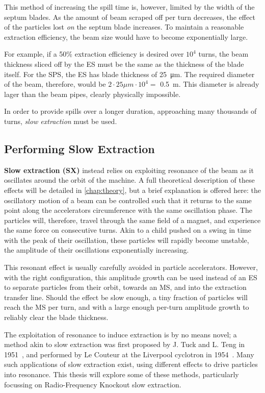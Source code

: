 \documentclass[11pt]{report}
\begin{document}
This method of increasing the spill time is, however, limited by the width of the septum blades. As the amount of beam scraped off per turn decreases, the effect of the particles lost \textit{on} the septum blade increases. To maintain a reasonable extraction efficiency, the beam size would have to become exponentially large.

For example, if a 50\% extraction efficiency is desired over $10^4$ turns, the beam thickness sliced off by the ES must be the same as the thickness of the blade itself. For the SPS, the ES has blade thickness of \qty{25}{\micro\meter}. The required diameter of the beam, therefore, would be $2\cdot 25\mu m\cdot 10^4 = $ \qty{0.5}{\meter}. This diameter is already lager than the beam pipes, clearly physically impossible.

In order to provide spills over a longer duration, approaching many thousands of turns, \textit{slow extraction} must be used. 

\subsection{Performing Slow Extraction}

\textbf{Slow extraction (SX)} instead relies on exploiting resonance of the beam as it oscillates around the orbit of the machine. A full theoretical description of these effects will be detailed in \autoref{chap:theory}, but a brief explanation is offered here: the oscillatory motion of a beam can be controlled such that it returns to the same point along the accelerators circumference with the same oscillation phase. The particles will, therefore, travel through the same field of a magnet, and experience the same force on consecutive turns. Akin to a child pushed on a swing in time with the peak of their oscillation, these particles will rapidly become unstable, the amplitude of their oscillations exponentially increasing. 

This resonant effect is usually carefully avoided in particle accelerators. However, with the right configuration, this amplitude growth can be used instead of an ES to separate particles from their orbit, towards an MS, and into the extraction transfer line. Should the effect be slow enough, a tiny fraction of particles will reach the MS per turn, and with a large enough per-turn amplitude growth to reliably clear the blade thickness.

The exploitation of resonance to induce extraction is by no means novel; a method akin to slow extraction was first proposed by J. Tuck and L. Teng in 1951~\cite{Couteur_1951}, and performed by Le Couteur at the Liverpool cyclotron in 1954~\cite{Couteur_1955}. Many such applications of slow extraction exist, using different effects to drive particles into resonance. This thesis will explore some of these methods, particularly focussing on Radio-Frequency Knockout slow extraction.
\end{document}

